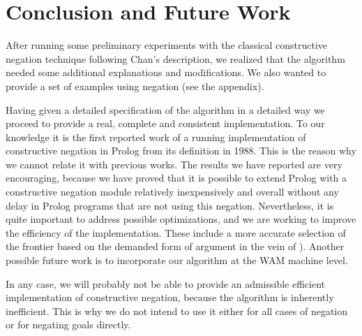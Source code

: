 \documentclass{tlp}
\begin{document}
\section{Conclusion and Future Work}
\label{conclusion}
After running some preliminary experiments with the classical constructive 
negation technique  following Chan's description, we realized that the
algorithm needed some additional explanations and modifications. We also
wanted to provide a set of examples using negation (see the appendix).

Having given a detailed specification of the algorithm in a detailed way
we proceed to provide a real, complete and consistent
implementation. To our knowledge it is the first reported work of a running
implementation
of constructive negation in Prolog from its definition in 1988. 
This is the reason why we cannot relate it with previous works.
The results we have reported are very encouraging,
because we have proved that it is possible to extend Prolog with a
constructive negation module relatively inexpensively and overall
without any delay in Prolog programs that are not using this
negation. Nevertheless, it is quite important to address possible
optimizations, and we are working to improve the efficiency of the
implementation. These include a more accurate selection of the
frontier based on the demanded form of argument in the vein of
\cite{Moreno2}). 
Another possible future work is to incorporate our algorithm
at the WAM machine level.

In any case, we will probably not be able to provide an admissible efficient
implementation of constructive negation, because the algorithm is
inherently inefficient.  This is why we do not intend to
use it either for all cases of negation or for negating goals
directly.
\end{document}
